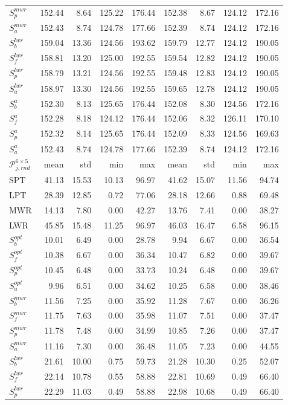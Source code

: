 {\begin{table}
{\begin{tabular}{|l|rrrr|rrrr|}
$S^{mwr}_p$ &152.44&8.64&125.22&176.44&152.38&8.67&124.12&172.16\\
$S^{mwr}_a$ &152.43&8.74&124.78&177.66&152.39&8.74&124.12&172.16\\
$S^{lwr}_b$ &159.04&13.36&124.56&193.62&159.79&12.77&124.12&190.05\\
$S^{lwr}_f$ &158.81&13.20&125.00&192.55&159.54&12.82&124.12&190.05\\
$S^{lwr}_p$ &158.79&13.21&124.56&192.55&159.48&12.83&124.12&190.05\\
$S^{lwr}_a$ &158.97&13.30&124.56&192.55&159.65&12.78&124.12&190.05\\
$S^{a}_b$ &152.30&8.13&125.65&176.44&152.08&8.30&124.56&172.16\\
$S^{a}_f$ &152.28&8.18&124.12&176.44&152.06&8.32&126.11&170.10\\
$S^{a}_p$ &152.32&8.14&125.65&176.44&152.09&8.33&124.56&169.63\\
$S^{a}_a$ &152.43&8.74&124.78&177.66&152.39&8.74&124.12&172.16\\
\hline
$\mathcal{P}^{6\times5}_{j,rnd}$ & mean & std & min & max & mean & std & min & max \\
\hline
SPT &41.13&15.53&10.13&96.97&41.62&15.07&11.56&94.74\\
LPT &28.39&12.85&0.72&77.06&28.18&12.66&0.88&69.48\\
MWR &14.13&7.80&0.00&42.27&13.76&7.41&0.00&38.27\\
LWR &45.85&15.48&11.25&96.97&46.03&16.47&6.58&96.15\\
$S^{opt}_b$ &10.01&6.49&0.00&28.78&9.94&6.67&0.00&36.54\\
$S^{opt}_f$ &10.38&6.67&0.00&36.34&10.47&6.82&0.00&39.67\\
$S^{opt}_p$ &10.45&6.48&0.00&33.73&10.24&6.48&0.00&39.67\\
$S^{opt}_a$ &9.96&6.51&0.00&34.62&10.25&6.58&0.00&38.46\\
$S^{mwr}_b$ &11.56&7.25&0.00&35.92&11.28&7.67&0.00&36.26\\
$S^{mwr}_f$ &11.75&7.63&0.00&35.98&11.07&7.51&0.00&37.47\\
$S^{mwr}_p$ &11.78&7.48&0.00&34.99&10.85&7.26&0.00&37.47\\
$S^{mwr}_a$ &11.16&7.30&0.00&36.48&11.05&7.23&0.00&44.55\\
$S^{lwr}_b$ &21.61&10.00&0.75&59.73&21.28&10.30&0.25&52.07\\
$S^{lwr}_f$ &22.14&10.78&0.55&58.88&22.81&10.69&0.49&66.40\\
$S^{lwr}_p$ &22.29&11.03&0.49&58.88&22.98&10.68&0.49&66.40\\

\end{tabular}}
\end{table}}

